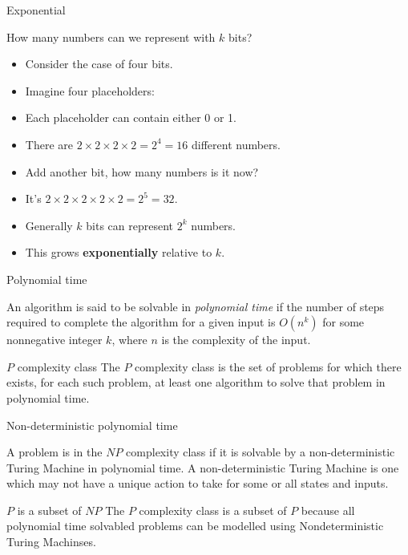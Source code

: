 \begin{frame}[fragile]{Exponential}
  \begin{exampleblock}{How many numbers can we represent with $k$ bits?}
    \begin{itemize}
      \item Consider the case of four bits.
      \item Imagine four placeholders:  \textbf{}\textbf{}\textbf{}\textbf{}
      \item Each placeholder can contain either 0 or 1.
      \item There are $2 \times 2 \times 2 \times 2 = 2^4 = 16$ different numbers.
      \item Add another bit, how many numbers is it now?
      \item It's $2 \times 2 \times 2 \times 2 \times 2 = 2^5 = 32$.
      \item Generally $k$ bits can represent $2^k$ numbers.
      \item This grows \textbf{exponentially} relative to $k$.
    \end{itemize}
  \end{exampleblock}
\end{frame}


\begin{frame}{Polynomial time}
  \begin{definition}
  An algorithm is said to be solvable in \emph{polynomial time} if the number of steps required to complete the algorithm for a given input is $O(n^k)$ for some nonnegative integer $k$, where $n$ is the complexity of the input.
  \end{definition}
  
  \vspace{0.5cm}
  \begin{block}{$P$ complexity class}
  The $P$ complexity class is the set of problems for which there exists, for each such problem, at least one algorithm to solve that problem in polynomial time.
  \end{block}

\end{frame}


\begin{frame}{Non-deterministic polynomial time}
  \begin{definition}
  A problem is in the $NP$ complexity class if it is solvable by a non-deterministic Turing Machine in polynomial time. A non-deterministic Turing Machine is one which may not have a unique action to take for some or all states and inputs.
  \end{definition}
  
  \vspace{0.5cm}
  \begin{block}{$P$ is a subset of $NP$}
  The $P$ complexity class is a subset of $P$ because all polynomial time solvabled problems can be modelled using Nondeterministic Turing Machinses.
  \end{block}

\end{frame}


